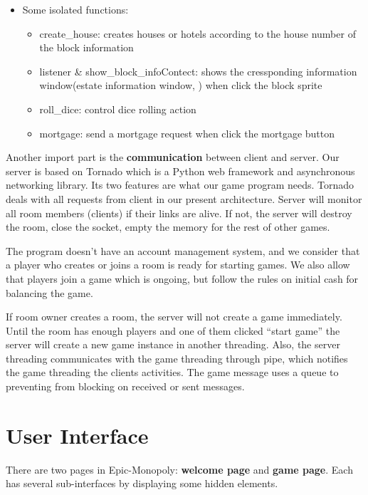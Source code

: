 \documentclass[a4paper,12pt]{article}
\begin{document}
\begin{itemize}
\begin{itemize}
\begin{itemize}
\begin{itemize}
	\end{itemize}
		\end{itemize}
		\item  Some isolated functions:
		\begin{itemize}
			\item create\_house: creates houses or hotels according to the house number of the block information
			\item listener \& show\_block\_infoContect: shows the cressponding information window(estate information window, ) when click the block sprite
			\item roll\_dice: control dice rolling action
			\item mortgage: send a mortgage request when click the mortgage button
		\end{itemize}
	\end{itemize}
\end{itemize}

Another import part is the \textbf{communication} between client and server.
Our server is based on Tornado which is a Python web framework and asynchronous networking library. Its two features are what our game program needs. Tornado deals with all requests from client in our present architecture. Server will monitor all room members (clients) if their links are alive. If not, the server will destroy the room, close the socket, empty the memory for the rest of other games. 

The program doesn’t have an account management system, and we consider that a player who creates or joins a room is ready for starting games. We also allow that players join a game which is ongoing, but follow the rules on initial cash for balancing the game.

If room owner creates a room, the server will not create a game immediately. Until the room has enough players and one of them clicked “start game” the server will create a new game instance in another threading. Also, the server threading communicates with the game threading through pipe, which notifies the game threading the clients activities. The game message uses a queue to preventing from blocking on received or sent messages.


\section{User Interface}
\lettrine[lines=2,loversize=0.35,lraise=0.07,findent=3pt,nindent=2pt]{T}{}here are two pages in Epic-Monopoly: \textbf{welcome page} and \textbf{game page}. Each has several sub-interfaces by displaying some hidden elements. 
\end{document}
